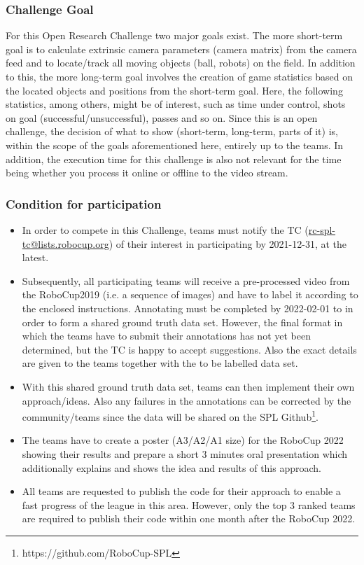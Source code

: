     \subsubsection{Challenge Goal}
    For this Open Research Challenge two major goals exist. The more short-term goal is to calculate extrinsic camera parameters (camera matrix) from the camera feed and to locate/track all moving objects (ball, robots) on the field. In addition to this, the more long-term goal involves the creation of game statistics based on the located objects and positions from the short-term goal. Here, the following statistics, among others, might be of interest, such as time under control, shots on goal (successful/unsuccessful), passes and so on. Since this is an open challenge, the decision of what to show (short-term, long-term, parts of it) is, within the scope of the goals aforementioned here, entirely up to the teams. In addition, the execution time for this challenge is also not relevant for the time being whether you process it online or offline to the video stream.

    \subsubsection{Condition for participation}
    \begin{itemize}
    \item In order to compete in this Challenge, teams must notify the TC (\url{rc-spl-tc@lists.robocup.org}) of their interest in participating by 2021-12-31, at the latest.
    \item Subsequently, all participating teams will receive a pre-processed video from the RoboCup2019 (i.e. a sequence of images) and have to label it according to the enclosed instructions. Annotating must be completed by 2022-02-01 to in order to form a shared ground truth data set. However, the final format in which the teams have to submit their annotations has not yet been determined, but the TC is happy to accept suggestions. Also the exact details are given to the teams together with the to be labelled data set.
    \item With this shared ground truth data set, teams can then implement their own approach/ideas. Also any failures in the annotations can be corrected by the community/teams since the data will be shared on the SPL Github\footnote{https://github.com/RoboCup-SPL}.
    \item The teams have to create a poster (A3/A2/A1 size) for the RoboCup 2022 showing their results and prepare a short 3 minutes oral presentation which additionally explains and shows the idea and results of this approach.
    \item All teams are requested to publish the code for their approach to enable a fast progress of the league in this area. However, only the top 3 ranked teams are required to publish their code within one month after the RoboCup 2022.
    \end{itemize}

